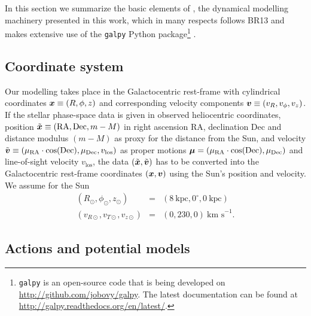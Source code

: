 
In this section we summarize the basic elements of \RM{}, the dynamical modelling machinery presented in this work, which in many respects follows BR13 and makes extensive use of the \texttt{galpy} Python package\footnote{\texttt{galpy} is an open-source code that is being developed on \url{http://github.com/jobovy/galpy}. The latest documentation can be found at \url{http://galpy.readthedocs.org/en/latest/}.} \citep{2015ApJS..216...29B}.  

\subsection{Coordinate system} \label{sec:coordinates}

Our modelling takes place in the Galactocentric rest-frame with cylindrical coordinates $\boldsymbol{x} \equiv (R,\phi,z)$ and corresponding velocity components $\boldsymbol{v} \equiv (v_R,v_\phi,v_z)$. If the stellar phase-space data is given in observed heliocentric coordinates, position $\tilde{\boldsymbol{x}} \equiv(\text{RA},\text{Dec},m-M)$ in right ascension RA, declination Dec and distance modulus $(m-M)$ as proxy for the distance from the Sun, and velocity $\tilde{\boldsymbol{v}} \equiv (\mu_\text{RA} \cdot \cos ( \text{Dec}),\mu_\text{Dec},v_\text{los})$ as proper motions $\boldsymbol{\mu}=(\mu_\text{RA} \cdot \cos (\text{Dec}),\mu_\text{Dec})$ and line-of-sight velocity $v_\text{los}$, the data $(\tilde{\boldsymbol{x}},\tilde{\boldsymbol{v}})$ has to be converted into the Galactocentric rest-frame coordinates $(\boldsymbol{x},\boldsymbol{v})$ using the Sun's position and velocity. We assume for the Sun
\begin{eqnarray*}
(R_\odot,\phi_\odot,z_\odot) &=&(8~\text{kpc}, 0^\circ, 0~\text{kpc})\\
(v_{R\odot},v_{T\odot},v_{z\odot}) &=& (0,230,0)~\text{km s}^{-1}.
\end{eqnarray*}

\subsection{Actions and potential models}  \label{sec:potentials}

